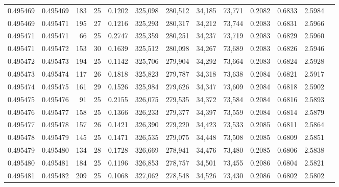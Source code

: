 \begin{tabular}{rrrrrrrrrrrrr}
0.495469 & 0.495469 & 183 &  25 &                                     0.1202 & 325,098 & 280,512 &  34,185 &  73,771 & 0.2082 & 0.6833 & 2.5984 \\
0.495469 & 0.495471 & 195 &  27 &                                     0.1216 & 325,293 & 280,317 &  34,212 &  73,744 & 0.2083 & 0.6831 & 2.5966 \\
0.495471 & 0.495471 &  66 &  25 &                                     0.2747 & 325,359 & 280,251 &  34,237 &  73,719 & 0.2083 & 0.6829 & 2.5960 \\
0.495471 & 0.495472 & 153 &  30 &                                     0.1639 & 325,512 & 280,098 &  34,267 &  73,689 & 0.2083 & 0.6826 & 2.5946 \\
0.495472 & 0.495473 & 194 &  25 &                                     0.1142 & 325,706 & 279,904 &  34,292 &  73,664 & 0.2083 & 0.6824 & 2.5928 \\
0.495473 & 0.495474 & 117 &  26 &                                     0.1818 & 325,823 & 279,787 &  34,318 &  73,638 & 0.2084 & 0.6821 & 2.5917 \\
0.495474 & 0.495475 & 161 &  29 &                                     0.1526 & 325,984 & 279,626 &  34,347 &  73,609 & 0.2084 & 0.6818 & 2.5902 \\
0.495475 & 0.495476 &  91 &  25 &                                     0.2155 & 326,075 & 279,535 &  34,372 &  73,584 & 0.2084 & 0.6816 & 2.5893 \\
0.495476 & 0.495477 & 158 &  25 &                                     0.1366 & 326,233 & 279,377 &  34,397 &  73,559 & 0.2084 & 0.6814 & 2.5879 \\
0.495477 & 0.495478 & 157 &  26 &                                     0.1421 & 326,390 & 279,220 &  34,423 &  73,533 & 0.2085 & 0.6811 & 2.5864 \\
0.495478 & 0.495479 & 145 &  25 &                                     0.1471 & 326,535 & 279,075 &  34,448 &  73,508 & 0.2085 & 0.6809 & 2.5851 \\
0.495479 & 0.495480 & 134 &  28 &                                     0.1728 & 326,669 & 278,941 &  34,476 &  73,480 & 0.2085 & 0.6806 & 2.5838 \\
0.495480 & 0.495481 & 184 &  25 &                                     0.1196 & 326,853 & 278,757 &  34,501 &  73,455 & 0.2086 & 0.6804 & 2.5821 \\
0.495481 & 0.495482 & 209 &  25 &                                     0.1068 & 327,062 & 278,548 &  34,526 &  73,430 & 0.2086 & 0.6802 & 2.5802 \\

\end{tabular}
